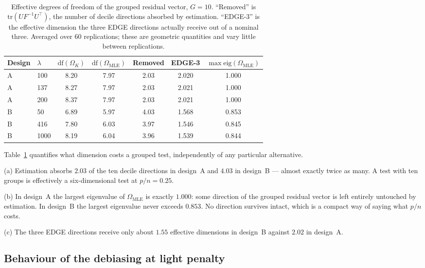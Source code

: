 \documentclass[11pt,a4paper]{article}
\theoremstyle{plain}
\theoremstyle{remark}
\begin{document}
\begin{table}[htbp]
\centering
\caption{Effective degrees of freedom of the grouped residual vector, $G = 10$. ``Removed''
is $\mathrm{tr}(UF^{-1}U^{\top})$, the number of decile directions absorbed by estimation.
``EDGE-3'' is the effective dimension the three EDGE directions actually receive out of a
nominal three. Averaged over $60$ replications; these are geometric quantities and vary
little between replications.}
\label{tab:geometry}
\begin{tabular}{llccccc}
\toprule
Design & $\lambda$ & $\mathrm{df}(\Omega_K)$ & $\mathrm{df}(\Omega_{\mathrm{MLE}})$
& Removed & EDGE-3 & $\max\mathrm{eig}(\Omega_{\mathrm{MLE}})$ \\
\midrule
A & 100  & 8.20 & 7.97 & 2.03 & 2.020 & 1.000 \\
A & 137  & 8.27 & 7.97 & 2.03 & 2.021 & 1.000 \\
A & 200  & 8.37 & 7.97 & 2.03 & 2.021 & 1.000 \\
\midrule
B & 50   & 6.89 & 5.97 & 4.03 & 1.568 & 0.853 \\
B & 416  & 7.80 & 6.03 & 3.97 & 1.546 & 0.845 \\
B & 1000 & 8.19 & 6.04 & 3.96 & 1.539 & 0.844 \\
\bottomrule
\end{tabular}
\end{table}

Table~\ref{tab:geometry} quantifies what dimension costs a grouped test, independently of
any particular alternative.

(a) Estimation absorbs $2.03$ of the ten decile directions in design~A and $4.03$ in
design~B --- almost exactly twice as many. A test with ten groups is effectively a
six-dimensional test at $p/n = 0.25$.

(b) In design~A the largest eigenvalue of $\Omega_{\mathrm{MLE}}$ is exactly $1.000$:
some direction of the grouped residual vector is left entirely untouched by estimation.
In design~B the largest eigenvalue never exceeds $0.853$. No direction survives intact,
which is a compact way of saying what $p/n$ costs.

(c) The three EDGE directions receive only about $1.55$ effective dimensions in design~B
against $2.02$ in design~A.

\subsection{Behaviour of the debiasing at light penalty}\label{sec:overshoot}
\end{document}

